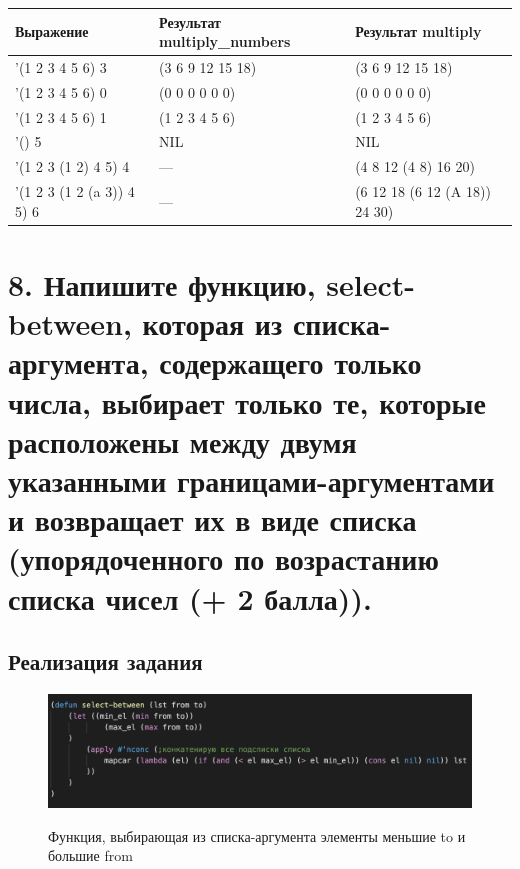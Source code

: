 \documentclass[a4paper,12pt]{article}
\begin{document}
	\begin{table} [h!]
		\begin{center}
			\begin{tabular}{|l|l|l|}
				\hline
				{\bf  Выражение} & {\bf Результат multiply\_numbers} & {\bf Результат multiply} \\
				\hline
				{'(1 2 3 4 5 6) 3} & (3 6 9 12 15 18) & (3 6 9 12 15 18)\\
				\hline
				{'(1 2 3 4 5 6) 0} & (0 0 0 0 0 0) & (0 0 0 0 0 0)\\
				\hline
				{'(1 2 3 4 5 6) 1} & (1 2 3 4 5 6) & (1 2 3 4 5 6)\\
				\hline
				{'() 5} & NIL & NIL\\
				\hline
				{'(1 2 3 (1 2) 4 5) 4} & --- & (4 8 12 (4 8) 16 20)\\
				\hline 
				{'(1 2 3 (1 2 (a 3)) 4 5) 6} & --- & (6 12 18 (6 12 (A 18)) 24 30)\\
			\end{tabular}  
			\label{m5}
		\end{center}
	\end{table}
	
	
	\newpage
	
	\section*{8. Напишите функцию, select-between, которая из списка-аргумента,
содержащего только числа, выбирает только те, которые расположены между двумя указанными границами-аргументами и возвращает их в виде списка (упорядоченного по возрастанию списка чисел (+ 2 балла)).
	}
	
	\subsection*{Реализация задания}
	
	\begin{figure}[h!]
		\begin{center}
			{\includegraphics[scale = 0.7]{8.1.png}}
			\label{ris:8.1}
		\end{center}
	\caption{Функция, выбирающая из списка-аргумента элементы меньшие to и большие from}
	\end{figure}
\end{document}
